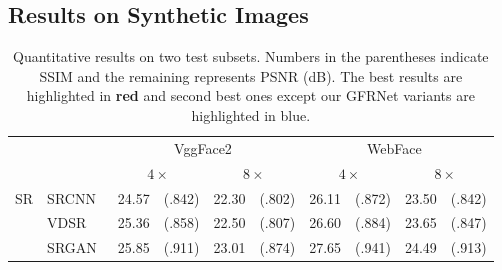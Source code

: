 \documentclass[runningheads]{llncs}
\begin{document}
\subsection{Results on Synthetic Images}
\begin{table*}[t]
	{\scriptsize \caption{Quantitative results on two test subsets. Numbers in the parentheses indicate SSIM and the remaining represents PSNR (dB). The best results are highlighted in {\bf \color{red}red} and second best ones except our GFRNet variants are highlighted in {\color{blue}blue}.
		}
		\begin{center}
			\label{table::Quantization}
\begin{tabular}{ c| l|c c c  c|c c c c}\hline
				\multicolumn{2}{c|}{\multirow{2}{*}{\makecell[c]{Methods}}} & \multicolumn{4}{c}{VggFace2~\cite{Vggface2}} &  \multicolumn{4}{|c}{WebFace~\cite{Webface}}\\
				\cline{3-10}
				\multicolumn{2}{c|}{}&\multicolumn{2}{c}{$4\times$} &  \multicolumn{2}{c}{$8\times$} &\multicolumn{2}{|c}{$4\times$} &  \multicolumn{2}{c}{$8\times$}\\
				\hline
				\multirow{4}{*}{SR}&SRCNN~\cite{dong2014learning}& 24.57 & (.842) & 22.30 & (.802)& 26.11 & (.872) & 23.50 & (.842) \\
				&VDSR~\cite{kim2016accurate}& 25.36 & (.858) & 22.50 & (.807)& 26.60 & (.884) &  23.65 & (.847)\\
				&SRGAN~\cite{Ledig2017CVPR}& 25.85 & (.911) & 23.01 & (.874)& 27.65 & (.941) &  24.49 & (.913)\\
				

\end{tabular}
\end{center}}
\end{table*}
\end{document}
